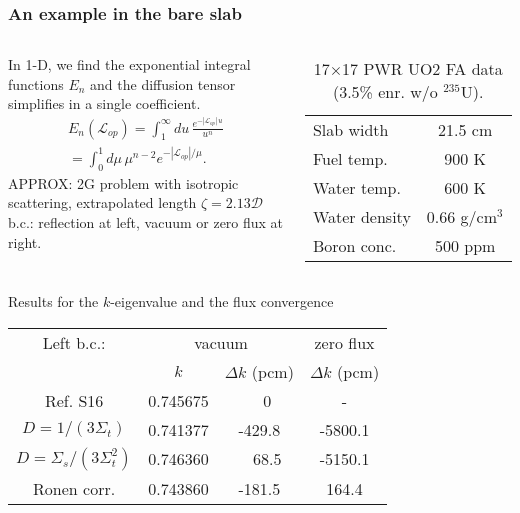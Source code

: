 \begin{frame}[allowframebreaks]
  \frametitle{An example in the bare slab}
  {\hfill \cite{tomatis2011application}}%

  \begin{columns}
  \begin{block}{}
  In 1-D, we find the \textcolor{ceablue1}{exponential integral functions $E_n$} and the diffusion tensor simplifies in a single coefficient.
  \[
    \begin{split}
    E_n(\mathcal{L}_{op}) = \int_1^{\infty}{du\, \frac{e^{-|\mathcal{L}_{op}|\,u}}{u^n}}\\
      = \int_0^1 {d\mu \, \mu^{n-2} e^{-|\mathcal{L}_{op}| / \mu}}.
    \end{split}
  \]
  {\textcolor{ceablue1}{APPROX}: 2G problem with isotropic scattering, extrapolated length $\zeta = 2.13 \mathcal{D}$}\\
  {\textcolor{ceablue1}{b.c.}: reflection at left, vacuum or zero flux at right.}
  \end{block}
  \begin{table}\centering
  \caption{17$\times$17 PWR UO2 FA data (3.5\% enr. w/o $^{235}$U).}
  \begin{tabular}{lc} \hline \hline
    Slab width & 21.5 cm\\
    Fuel temp. & 900 K\\
    Water temp.& 600 K\\
    Water density& 0.66 g/cm$^3$\\
    Boron conc.& 500 ppm\\ \hline \hline
  \end{tabular}
  \end{table}
  \end{columns}

  \begin{block}{Results for the $k$-eigenvalue and the flux convergence}
  \centering
  \begin{tabular}{*{4}{c}} \hline \hline
   Left b.c.: & \multicolumn{2}{c}{vacuum} & zero flux\\
   \cline{2-4}
    & $k$ & $\Delta k$ (pcm) & $\Delta k$ (pcm) \\ \hline
    Ref. S16             & 0.745675 & ~~~0~ &    -    \\
    $D = 1/(3 \Sigma_t)$ & 0.741377 & -429.8& -5800.1 \\
    $D = \Sigma_s/(3 \Sigma_t^2)$ & 0.746360 & ~~68.5& -5150.1 \\
    Ronen corr. & 0.743860 & \textcolor{ceablue1}{-181.5} & \textcolor{ceablue1}{164.4}\\
    \hline \hline
  \end{tabular}
  \end{block}


\end{frame}

